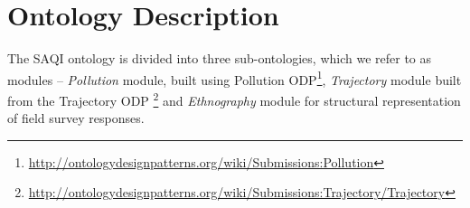 \section{Ontology Description}
\label{sec:ontology-desc}

The SAQI ontology is divided into three sub-ontologies, which we refer to as modules -- \emph{Pollution} module, built using Pollution ODP\footnote{\url{http://ontologydesignpatterns.org/wiki/Submissions:Pollution}}, \emph{Trajectory} module built from the Trajectory ODP 
\footnote{\url{http://ontologydesignpatterns.org/wiki/Submissions:Trajectory/Trajectory}} and \emph{Ethnography} module for structural representation of field survey responses.



